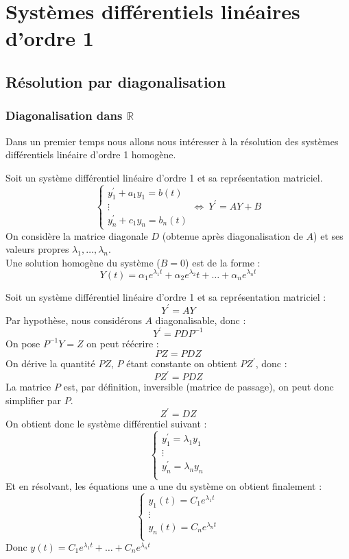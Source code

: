 \section{Systèmes différentiels linéaires d'ordre 1}
\subsection{Résolution par diagonalisation}
\subsubsection{Diagonalisation dans $\mathbb{R}$}
Dans un premier temps nous allons nous intéresser à la résolution des systèmes différentiels linéaire d'ordre 1 homogène.
\begin{thm}[Théorème]
Soit un système différentiel linéaire d'ordre 1 et sa représentation matriciel.
$$
\begin{cases}
y_1^{\prime}+a_1 y_1 = b(t)\\
\vdots\\
y_{n}^{\prime}+c_1 y_n = b_n(t)
\end{cases}\Leftrightarrow\ Y^{\prime}=AY+B$$
On considère la matrice diagonale $D$ (obtenue après diagonalisation de $A$) et ses valeurs propres $\lambda_1,\hdots,\lambda_n$.\\
Une solution homogène du système ($B=0$) est de la forme :
$$Y(t)=\alpha_1 e^{\lambda_1 t} +\alpha_2 e^{\lambda_2}t+\hdots+\alpha_n e^{\lambda_n t}$$
\end{thm}
\begin{demo}
Soit un système différentiel linéaire d'ordre 1 et sa représentation matriciel :
$$Y^{\prime}=AY$$
Par hypothèse, nous considérons $A$ diagonalisable, donc :
$$Y^{\prime}=PDP^{-1}$$
On pose $P^{-1}Y=Z$ on peut réécrire : 
$$PZ=PDZ$$
On dérive la quantité $PZ$, $P$ étant constante on obtient $PZ^{\prime}$, donc :
$$PZ^{\prime}=PDZ$$
La matrice $P$ est, par définition, inversible (matrice de passage), on peut donc simplifier par $P$.
$$Z^{\prime}=DZ$$
On obtient donc le système différentiel suivant :
$$\begin{cases}
y_1^{\prime}=\lambda_1 y_1\\
\vdots\\
y_n^{\prime}=\lambda_n y_n\\
\end{cases}$$
Et en résolvant, les équations une a une du système on obtient finalement :
$$\begin{cases}
y_1(t)=C_1 e^{\lambda_1 t}\\
\vdots\\
y_n(t)=C_n e^{\lambda_n t}\\
\end{cases}$$
Donc $y(t)=C_1 e^{\lambda_1 t}+\hdots+C_n e^{\lambda_n t}$
\end{demo}
